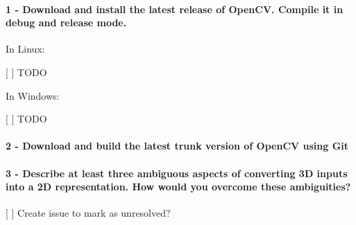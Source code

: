 \paragraph*{1 -\/ Download and install the latest release of Open\+CV. Compile it in debug and release mode.}


\begin{DoxyItemize}
\item In Linux\+:
\begin{DoxyItemize}
\item \mbox{[} \mbox{]} T\+O\+DO
\end{DoxyItemize}
\item In Windows\+:
\begin{DoxyItemize}
\item \mbox{[} \mbox{]} T\+O\+DO
\end{DoxyItemize}
\end{DoxyItemize}

\paragraph*{2 -\/ Download and build the latest trunk version of Open\+CV using Git}

\paragraph*{3 -\/ Describe at least three ambiguous aspects of converting 3D inputs into a 2D representation. How would you overcome these ambiguities?}


\begin{DoxyItemize}
\item \mbox{[} \mbox{]} Create issue to mark as unresolved? 
\end{DoxyItemize}